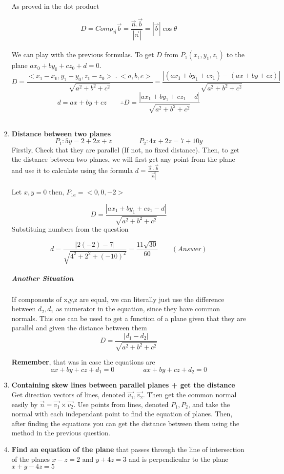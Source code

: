\documentclass{article}
\begin{document}
\begin{enumerate}[1.]
		As proved in the dot product 

		\[
			D = Comp_{ \vec{ n } } \vec{ b } 			= \frac{ \vec{ n } . \vec{ b } }{ | \vec{ n }| } = | \vec{ b } | \cos{ \theta } 
		\]
		\\ 
		We can play with the previous formulas. To get $D$ from $P_1(x_1,y_1,z_1)$ to the plane $ax_0+by_0+cz_0+d=0$.
		\[
			D = \frac{ <x_1-x_0, y_1-y_0, z_1-z_0>\ .\ <a,b,c> }{ \sqrt{a^2+b^2+c^2}}=  \frac{ |(ax_1+by_1+cz_1)-(ax+by+cz)| }{ \sqrt{a^2+b^2+c^2} }
		\]
		\[
			d = ax+by+cz \qquad	\therefore D = \frac{ |ax_1+by_1+cz_1-d| }{ \sqrt{a^2+b^2+c^2} }
		\]
		\\

	\item \textbf{Distance between two planes}
		\[
			P_1:5y=2+2x+z \qquad \qquad P_2:4x+2z=7+10y
		\]
		Firstly, Check that they are parallel (If not, no fixed distance). Then, to get the distance between two planes, we will first get any point from the plane and use it to calculate using the formula $ d = \frac{ \vec{ a }\ .\ \vec{ b } }{ | \vec{ a } | } $

		Let $x,y=0$ then, $P_{1a} = <0,0,-2>$

		\[
			D =  \frac{ |ax_1+by_1+cz_1-d| }{ \sqrt{a^2+b^2+c^2} }
		\]
		Substituing numbers from the question

		\[
			d = \frac{ |2(-2)-7| }{ \sqrt{4^2+2^2+(-10)^2} } = \frac{ 11 \sqrt{ 30 } }{ 60 }\qquad (Answer)
		\]
		\subparagraph{Another Situation}
		If components of x,y,z are equal, we can literally just use the difference between $d_2, d_1$ as numerator in the equation, since they have common normals. This one can be used to get a function of a plane given that they are parallel and given the distance between them
		\[
			D = \frac{ |d_1-d_2| }{ \sqrt{a^2+b^2+c^2} } 
		\]

		\textbf{Remember}, that was in case the equations are
		\[ ax + by + cz + d_1 = 0\ \qquad \qquad  ax + by + cz + d_2 = 0 \]
	\item \textbf{Containing skew lines between parallel planes + get the distance}
		Get direction vectors of lines, denoted $ \vec{ v_1 }, \vec{ v_2} $. Then get the common normal easily by $ \vec{ n }= \vec{ v_1 } \times \vec{ v_2 }$. Use points from lines, denoted $P_1, P_2$, and take the normal with each independant point to find the equation of planes. Then, after finding the equations you can get the distance between them using the method in the previous question.

	\item \textbf{Find an equation of the plane} that passes through the line of intersection of the planes $x - z = 2$ and $y + 4z = 3$ and is perpendicular to the plane $x+y-4z=5$


\end{enumerate}
\end{document}
